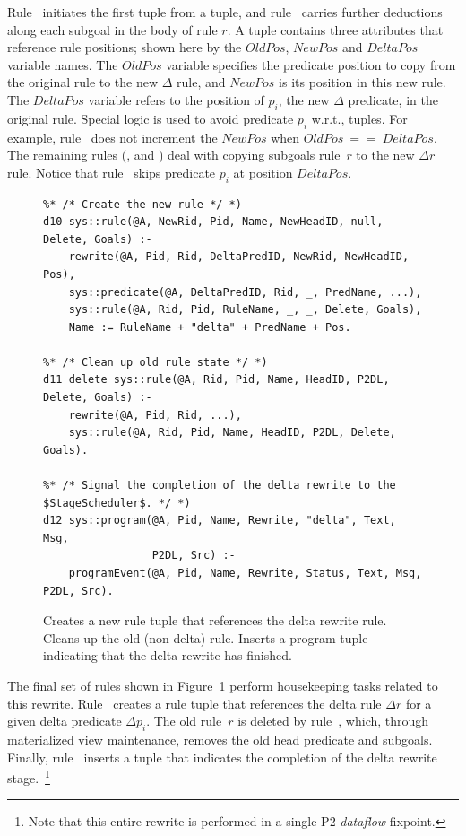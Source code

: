 Rule~ initiates the first  tuple from a 
tuple, and rule~ carries further  deductions along each
subgoal in the body of rule $r$.  A  tuple contains three
attributes that reference rule positions; shown here by the $OldPos$, $NewPos$
and $DeltaPos$ variable names.  The $OldPos$ variable specifies the predicate
position to copy from the original rule to the new $\Delta$ rule, and $NewPos$
is its position in this new rule.  The $DeltaPos$ variable refers to the
position of $p_i$, the new $\Delta$ predicate, in the original rule.  Special
logic is used to avoid predicate $p_i$ w.r.t.,  tuples.  For
example, rule~ does not increment the $NewPos$ when $OldPos\ ==\
DeltaPos$.  The remaining rules (,  and ) deal with
copying subgoals rule~$r$ to the new $\Delta r$ rule.  Notice that rule~
skips predicate $p_i$ at position $DeltaPos$.

\begin{figure}[!t]
\ssp
\centering
\begin{lstlisting}
%* /* Create the new rule */ *)
d10 sys::rule(@A, NewRid, Pid, Name, NewHeadID, null, Delete, Goals) :-
    rewrite(@A, Pid, Rid, DeltaPredID, NewRid, NewHeadID, Pos),
    sys::predicate(@A, DeltaPredID, Rid, _, PredName, ...),
    sys::rule(@A, Rid, Pid, RuleName, _, _, Delete, Goals),
    Name := RuleName + "delta" + PredName + Pos.

%* /* Clean up old rule state */ *)
d11 delete sys::rule(@A, Rid, Pid, Name, HeadID, P2DL, Delete, Goals) :-
    rewrite(@A, Pid, Rid, ...),
    sys::rule(@A, Rid, Pid, Name, HeadID, P2DL, Delete, Goals).
  
%* /* Signal the completion of the delta rewrite to the $StageScheduler$. */ *)
d12 sys::program(@A, Pid, Name, Rewrite, "delta", Text, Msg, 
                 P2DL, Src) :-
    programEvent(@A, Pid, Name, Rewrite, Status, Text, Msg, P2DL, Src).
\end{lstlisting}
\caption{\label{ch:evita:fig:delta4}Creates a new rule tuple that references the delta 
rewrite rule. Cleans up the old (non-delta) rule. Inserts a program tuple indicating
that the delta rewrite has finished. }
\end{figure}

The final set of rules shown in Figure~\ref{ch:evita:fig:delta4} perform
housekeeping tasks related to this rewrite.  Rule~\ol{d10} creates a rule tuple
that references the delta rule $\Delta r$ for a given delta predicate $\Delta
p_i$.  The old rule~$r$ is deleted by rule~\ol{d11}, which, through
materialized view maintenance, removes the old head predicate and subgoals.
Finally, rule~\ol{d12} inserts a \ol{program} tuple that indicates the
completion of the delta rewrite stage.~\footnote{Note that this entire rewrite
is performed in a single P2 {\em dataflow} fixpoint.}

